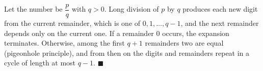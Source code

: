 Let the number be $\dfrac {p}{q}$ with $q>0$. Long division of $p$ by $q$ produces each new digit from the current remainder, which is one of $0,1,\dots,q-1$, and the next remainder depends only on the current one. If a remainder $0$ occurs, the expansion terminates. Otherwise, among the first $q+1$ remainders two are equal (pigeonhole principle), and from then on the digits and remainders repeat in a cycle of length at most $q-1$. $\blacksquare$
